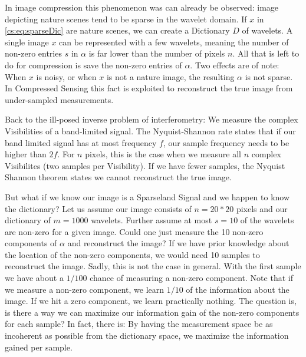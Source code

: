 In image compression this phenomenon was can already be observed: image depicting nature scenes tend to be sparse in the wavelet domain. If $x$ in \eqref{cs:eq:sparseDic} are nature scenes, we can create a Dictionary $D$ of wavelets. A single image $x$ can be represented with a few wavelets, meaning the number of non-zero entries $s$ in $\alpha$ is far lower than the number of pixels $n$. All that is left to do for compression is save the non-zero entries of $\alpha$. Two effects are of note: When $x$ is noisy, or when $x$ is not a nature image, the resulting $\alpha$ is not sparse. In Compressed Sensing this fact is exploited to reconstruct the true image from under-sampled measurements.


Back to the ill-posed inverse problem of interferometry: We measure the complex Visibilities of a band-limited signal. The Nyquist-Shannon rate states that if our band limited signal has at most frequency $f$, our sample frequency needs to be higher than $2f$. For $n$ pixels, this is the case when we measure all $n$ complex Visibilites (two samples per Visibility). If we have fewer samples, the Nyquist Shannon theorem states we cannot reconstruct the true image.

But what if we know our image is a Sparseland Signal and we happen to know the dictionary? Let us assume our image consists of $n = 20*20$ pixels and our dictionary of $m = 1000$ wavelets. Further assume at most $s=10$ of the wavelets are non-zero for a given image. Could one just measure the 10 non-zero components of $\alpha$ and reconstruct the image? If we have prior knowledge about the location of the non-zero components, we would need 10 samples to reconstruct the image. Sadly, this is not the case in general. With the first sample we have about a $1/100$ chance of measuring a non-zero component. Note that if we measure a non-zero component, we learn $1/10$ of the information about the image. If we hit a zero component, we learn practically nothing. The question is, is there a way we can maximize our information gain of the non-zero components for each sample? In fact, there is: By having the measurement space be  as incoherent as possible from the dictionary space, we maximize the information gained per sample.

